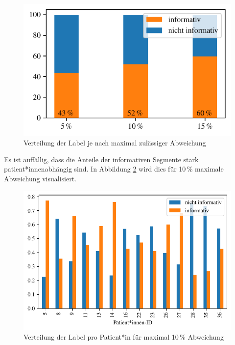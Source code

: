 	\begin{figure}[H]
		\centering
		\includegraphics{pic/label-distribution.pdf}
		\caption[Verteilung der Label je nach maximal zulässiger Abweichung]{Verteilung der Label je nach maximal zulässiger Abweichung}
		\label{fig:label-distribution}
	\end{figure}
	
	Es ist auffällig, dass die Anteile der informativen Segmente stark patient*innenabhängig sind. In Abbildung \ref{fig:data-stats-15} wird dies für 10\,\% maximale Abweichung visualisiert.
	
	\begin{figure}[H]
		\centering
		\includegraphics{pic/data-stats-10.pdf}
		\caption[Verteilung der Label pro Patient*in]{Verteilung der Label pro Patient*in für maximal 10\,\% Abweichung}
		\label{fig:data-stats-15}
	\end{figure}
	
